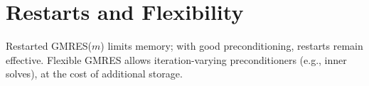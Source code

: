 \section{Restarts and Flexibility}
Restarted GMRES($m$) limits memory; with good preconditioning, restarts remain effective. Flexible GMRES allows iteration-varying preconditioners (e.g., inner solves), at the cost of additional storage.

